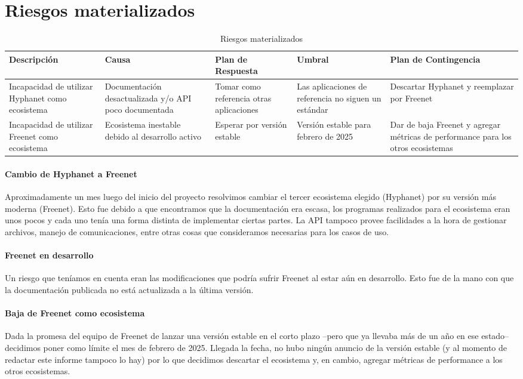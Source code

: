 \section{Riesgos materializados}

\setlength\tabcolsep{3pt}
\begin{table}[!htbp]
    \centering
    \begin{tabular}{*{5}{|p{70pt}}|}
    \hline
    \textbf{Descripción} & \textbf{Causa} & \textbf{Plan \break de \break Respuesta} & \textbf{Umbral} & \textbf{Plan \break de \break Contingencia} \\
    \hline\hline
    Incapacidad de utilizar Hyphanet como ecosistema & Documentación desactualizada y/o API poco documentada & Tomar como \break referencia \break otras \break aplicaciones & Las aplicaciones de referencia no siguen un estándar & Descartar \break Hyphanet y reemplazar por Freenet \\
    \hline
    Incapacidad de utilizar Freenet como ecosistema & Ecosistema \break inestable \break debido al \break desarrollo activo & Esperar por \break versión estable & Versión estable para febrero de 2025 & Dar de baja \break Freenet y agregar métricas de performance para los otros ecosistemas \\
    \hline
    \end{tabular}
    \caption{Riesgos materializados}
\end{table}

\paragraph{Cambio de Hyphanet a Freenet}
Aproximadamente un mes luego del inicio del proyecto resolvimos cambiar el tercer ecosistema elegido (Hyphanet) por su versión más moderna (Freenet). Esto fue debido a que encontramos que la documentación era escasa, los programas realizados para el ecosistema eran unos pocos y cada uno tenía una forma distinta de implementar ciertas partes. La API tampoco provee facilidades a la hora de gestionar archivos, manejo de comunicaciones, entre otras cosas que consideramos necesarias para los casos de uso.

\paragraph{Freenet en desarrollo}
Un riesgo que teníamos en cuenta eran las modificaciones que podría sufrir Freenet al estar aún en desarrollo. Esto fue de la mano con que la documentación publicada no está actualizada a la última versión.

\paragraph{Baja de Freenet como ecosistema}
Dada la promesa del equipo de Freenet de lanzar una versión estable en el corto plazo --pero que ya llevaba más de un año en ese estado-- decidimos poner como límite el mes de febrero de 2025. Llegada la fecha, no hubo ningún anuncio de la versión estable (y al momento de redactar este informe tampoco lo hay) por lo que decidimos descartar el ecosistema y, en cambio, agregar métricas de performance a los otros ecosistemas.